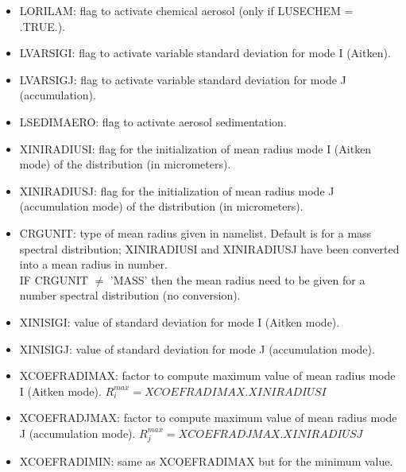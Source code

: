 \begin{itemize}

\item LORILAM: flag to activate chemical aerosol (only if LUSECHEM = .TRUE.).
\item LVARSIGI: flag to activate variable standard deviation for mode I (Aitken).
\item LVARSIGJ: flag to activate variable standard deviation for mode J (accumulation).
\item LSEDIMAERO: flag to activate aerosol sedimentation.
\item  XINIRADIUSI: flag for  the initialization of mean radius mode I (Aitken mode) of the distribution (in micrometers). 
\item  XINIRADIUSJ: flag for the initialization of mean radius mode J (accumulation mode) of the distribution (in micrometers). 
\item  CRGUNIT: type of mean radius given in namelist. Default is for a mass spectral distribution; XINIRADIUSI and XINIRADIUSJ have been converted into a  mean radius in number. \\ 
 IF CRGUNIT $\neq$ 'MASS' then the mean radius need to be given for a number spectral distribution (no conversion).  
\item  XINISIGI: value of standard deviation for mode I (Aitken mode).  
\item  XINISIGJ: value of standard deviation for mode J (accumulation mode).  

\item  XCOEFRADIMAX: factor to compute maximum value of mean radius mode I (Aitken mode). $R_i^{max} =  XCOEFRADIMAX . XINIRADIUSI $ 

\item  XCOEFRADJMAX: factor to compute maximum value of mean radius mode J (accumulation mode). $R_j^{max} =  XCOEFRADJMAX . XINIRADIUSJ $ 
\item  XCOEFRADIMIN: same as XCOEFRADIMAX but for the minimum value.


\end{itemize}
